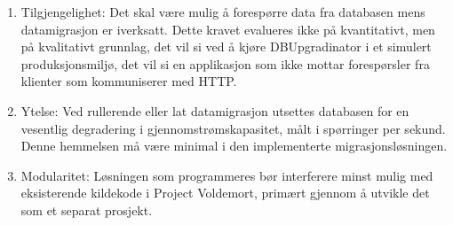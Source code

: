 \begin{enumerate}
  \item Tilgjengelighet: Det skal være mulig å forespørre data fra databasen mens datamigrasjon er iverksatt. Dette kravet evalueres ikke på kvantitativt, men på kvalitativt grunnlag, det vil si ved å kjøre DBUpgradinator i et simulert produksjonsmiljø, det vil si en applikasjon som ikke mottar forespørsler fra klienter som kommuniserer med HTTP.
  \item Ytelse: Ved rullerende eller lat datamigrasjon utsettes databasen for en vesentlig degradering i gjennomstrømskapasitet, målt i spørringer per sekund. Denne hemmelsen må være minimal i den implementerte migrasjonsløsningen.
  \item Modularitet: Løsningen som programmeres bør interferere minst mulig med eksisterende kildekode i Project Voldemort, primært gjennom å utvikle det som et separat prosjekt.
\end{enumerate}
